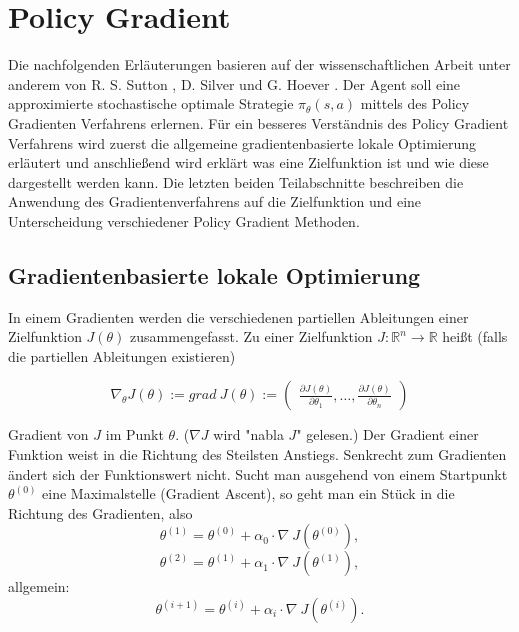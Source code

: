 \documentclass[conference]{IEEEtran}
\begin{document}
\section{Policy Gradient}
Die nachfolgenden Erläuterungen basieren auf der wissenschaftlichen Arbeit unter anderem von R. S. Sutton \cite{sutton_99}, D. Silver \cite{silver_15} und G. Hoever \cite[vgl. S. 213 f]{hoever_14}. Der Agent soll eine approximierte stochastische optimale Strategie $\pi_\theta (s, a)$ mittels des Policy Gradienten Verfahrens erlernen. Für ein besseres Verständnis des Policy Gradient Verfahrens wird zuerst die allgemeine gradientenbasierte lokale Optimierung erläutert und anschließend wird erklärt was eine Zielfunktion ist und wie diese dargestellt werden kann. Die letzten beiden Teilabschnitte beschreiben die Anwendung des Gradientenverfahrens auf die Zielfunktion und eine Unterscheidung verschiedener Policy Gradient Methoden.

\subsection{Gradientenbasierte lokale Optimierung}
In einem Gradienten werden die verschiedenen partiellen Ableitungen einer Zielfunktion $J(\theta)$ zusammengefasst. Zu einer Zielfunktion $J : \mathbb{R}^n \rightarrow \mathbb{R}$ heißt (falls die partiellen Ableitungen existieren)

\begin{equation*}
\nabla_\theta J(\theta) := grad \: J(\theta) := \begin{pmatrix}
\frac{\partial J(\theta)}{\partial \theta_1}, \hdots, \frac{\partial J(\theta)}{\partial \theta_n}
\end{pmatrix}
\end{equation*}

Gradient von $J$ im Punkt $\theta$. ($\nabla J$ wird "nabla $J$" gelesen.) Der Gradient einer Funktion weist in die Richtung des Steilsten Anstiegs. Senkrecht zum Gradienten ändert sich der Funktionswert nicht. Sucht man ausgehend von einem Startpunkt $\theta^{(0)}$ eine Maximalstelle (Gradient Ascent), so geht man ein Stück in die Richtung des Gradienten, also
\begin{equation*}
\theta^{(1)} = \theta^{(0)} + \alpha_0 \cdot \nabla \: J(\theta^{(0)}),
\end{equation*}
\begin{equation*}
\theta^{(2)} = \theta^{(1)} + \alpha_1 \cdot \nabla \: J(\theta^{(1)}),
\end{equation*}
allgemein:
\begin{equation*}
\theta^{(i+1)} = \theta^{(i)} + \alpha_i \cdot \nabla \: J(\theta^{(i)}).
\end{equation*}
\end{document}
